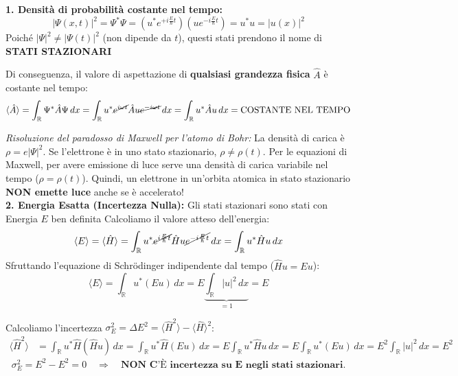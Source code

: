 \documentclass[11pt, a4paper]{article}
\begin{document}
\noindent
\textbf{1. Densità di probabilità costante nel tempo:} %
\begin{equation*}
    |\Psi(x,t)|^2 = \Psi^* \Psi = (u^* e^{+i\frac{E}{\hbar}t}) (u e^{-i\frac{E}{\hbar}t}) = u^* u = |u(x)|^2 %
\end{equation*}
Poiché $|\Psi|^2 \neq |\Psi(t)|^2$ (non dipende da $t$), questi stati prendono il nome di \textbf{STATI STAZIONARI} %

\noindent
Di conseguenza, il valore di aspettazione di \textbf{qualsiasi grandezza fisica} $\hat{A}$ è costante nel tempo: %
\begin{equation*}
    \langle \hat{A} \rangle = \int_{\mathbb{R}} \Psi^* \hat{A} \Psi \, dx = \int_{\mathbb{R}} u^* \cancel{e^{i\omega t}} \hat{A} u \cancel{e^{-i\omega t}} \, dx = \int_{\mathbb{R}} u^* \hat{A} u \, dx = \text{COSTANTE NEL TEMPO} %
\end{equation*}

\noindent
\textit{Risoluzione del paradosso di Maxwell per l'atomo di Bohr:} %
La densità di carica è $\rho = e|\Psi|^2$. Se l'elettrone è in uno stato stazionario, $\rho \neq \rho(t)$. Per le equazioni di Maxwell, per avere emissione di luce serve una densità di carica variabile nel tempo ($\rho = \rho(t)$). Quindi, un elettrone in un'orbita atomica in stato stazionario \textbf{NON emette luce} anche se è accelerato! \\

\noindent
\textbf{2. Energia Esatta (Incertezza Nulla):} %
Gli stati stazionari sono stati con Energia $E$ ben definita %
Calcoliamo il valore atteso dell'energia: %
\begin{equation*}
    \langle E \rangle = \langle \hat{H} \rangle = \int_{\mathbb{R}} u^* \cancel{e^{i\frac{E}{\hbar}t}} \hat{H} u \cancel{e^{-i\frac{E}{\hbar}t}} \, dx = \int_{\mathbb{R}} u^* \hat{H} u \, dx %
\end{equation*}
Sfruttando l'equazione di Schrödinger indipendente dal tempo ($\hat{H}u = Eu$): %
\begin{equation*}
    \langle E \rangle = \int_{\mathbb{R}} u^* (Eu) \, dx = E \underbrace{ \int_{\mathbb{R}} |u|^2 \, dx }_{=1} = E %
\end{equation*}

Calcoliamo l'incertezza $\sigma_E^2 = \Delta E^2 = \langle \hat{H}^2 \rangle - \langle \hat{H} \rangle^2$: %
\begin{align*}
    \langle \hat{H}^2 \rangle &= \int_{\mathbb{R}} u^* \hat{H} (\hat{H}u) \, dx = \int_{\mathbb{R}} u^* \hat{H} (Eu) \, dx = E \int_{\mathbb{R}} u^* \hat{H} u \, dx = E \int_{\mathbb{R}} u^* (Eu) \, dx = E^2 \int_{\mathbb{R}} |u|^2 \, dx = E^2 %
\end{align*}
\begin{equation*}
    \sigma_E^2 = E^2 - E^2 = 0 \quad \Rightarrow \quad \textbf{NON C'È incertezza su E negli stati stazionari.} %
\end{equation*}\\
\end{document}
